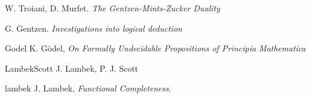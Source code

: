 \documentclass[12pt]{article}
\theoremstyle{plain}
\theoremstyle{definition}
\begin{document}
	
	
	
	
	\begin{thebibliography}{99}
		 W. Troiani, D. Murfet. \emph{The Gentzen-Mints-Zucker Duality}
		
		 G. Gentzen. \emph{Investigations into logical deduction}
		
		\item{Godel} K. G\"{o}del, \emph{On Formally Undecidable Propositions of Principia Mathematica}
		
		\item{LambekScott} J. Lambek, P. J. Scott
		
		\item{lambek} J. Lambek, \emph{Functional Completeness}.
	\end{thebibliography}
	
\end{document}
